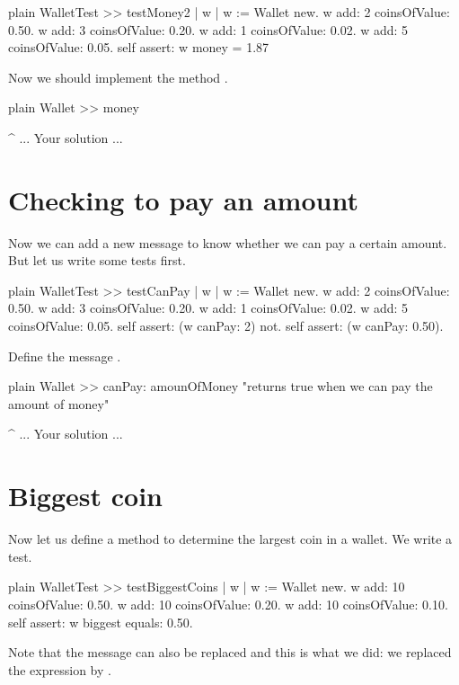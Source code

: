 \documentclass[10pt,twoside,english]{_support/latex/sbabook/sbabook}
\begin{document}
\begin{displaycode}{plain}
WalletTest >> testMoney2
	| w |
	w := Wallet new.
	w add: 2 coinsOfValue: 0.50.
	w add: 3 coinsOfValue: 0.20.
	w add: 1 coinsOfValue: 0.02.
	w add: 5 coinsOfValue: 0.05.
	self assert: w money = 1.87
\end{displaycode}

Now we should implement the method . 

\begin{displaycode}{plain}
Wallet >> money

	^ ... Your solution ...
\end{displaycode}
\section{Checking to pay an amount}
Now we can add a new message to know whether we can pay a certain amount. But let us write some tests first. 

\begin{displaycode}{plain}
WalletTest >> testCanPay
	| w |
	w := Wallet new.
	w add: 2 coinsOfValue: 0.50.
	w add: 3 coinsOfValue: 0.20.
	w add: 1 coinsOfValue: 0.02.
	w add: 5 coinsOfValue: 0.05.
	self assert: (w canPay: 2) not.
	self assert: (w canPay: 0.50).
\end{displaycode}

Define the message .

\begin{displaycode}{plain}
Wallet >> canPay: amounOfMoney
	"returns true when we can pay the amount of money"
	
	^ ... Your solution ...
\end{displaycode}
\section{Biggest coin}
Now let us define a method to determine the largest coin in a wallet. We write a test. 

\begin{displaycode}{plain}
WalletTest >> testBiggestCoins
	| w |
	w := Wallet new.
	w add: 10 coinsOfValue: 0.50.
	w add: 10 coinsOfValue: 0.20.
	w add: 10 coinsOfValue: 0.10.
	self assert: w biggest equals: 0.50.
\end{displaycode}

Note that the  message can also be replaced  and this is what we did: we replaced the expression  by .
\end{document}
